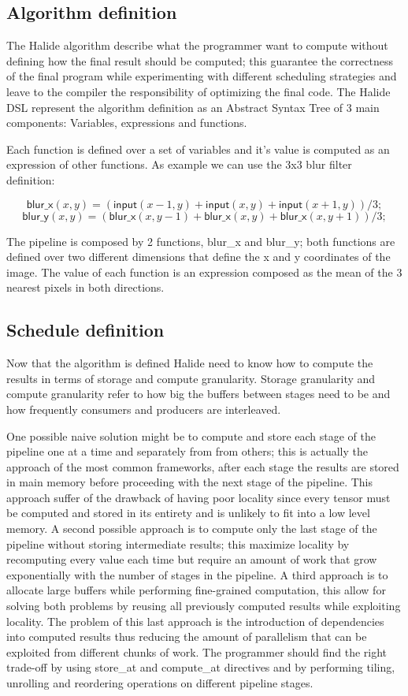 \documentclass[../main.tex]{subfiles}
\begin{document}
\subsection{Algorithm definition}
The Halide algorithm describe what the programmer want to compute without defining how the final result should be computed; this guarantee the correctness of the final program while experimenting with different scheduling strategies and leave to the compiler the responsibility of optimizing the final code.
The Halide DSL represent the algorithm definition as an Abstract Syntax Tree of 3 main components: Variables, expressions and functions.

\newpage
Each function is defined over a set of variables and it's value is computed as an expression of other functions. As example we can use the 3x3 blur filter definition:

\[ \mathsf{blur\_x}(x, y) = (\mathsf{input}(x-1, y) + \mathsf{input}(x, y) + \mathsf{input}(x+1, y))/3;\]
\[ \mathsf{blur\_y}(x, y) = (\mathsf{blur\_x}(x, y-1) + \mathsf{blur\_x}(x, y) + \mathsf{blur\_x}(x, y+1))/3;\]

The pipeline is composed by 2 functions, blur\_x and blur\_y; both functions are defined over two different dimensions that define the x and y coordinates of the image. The value of each function is an expression composed as the mean of the 3 nearest pixels in both directions.


\subsection{Schedule definition}
Now that the algorithm is defined Halide need to know how to compute the results in terms of storage and compute granularity. Storage granularity and compute granularity refer to how big the buffers between stages need to be and how frequently consumers and producers are interleaved.

One possible naive solution might be to compute and store each stage of the pipeline one at a time and separately from from others; this is actually the approach of the most common frameworks, after each stage the results are stored in main memory before proceeding with the next stage of the pipeline. This approach suffer of the drawback of having poor locality since every tensor must be computed and stored in its entirety and is unlikely to fit into a low level memory. 
A second possible approach is to compute only the last stage of the pipeline without storing intermediate results; this maximize locality by recomputing every value each time but require an amount of work that grow exponentially with the number of stages in the pipeline.
A third approach is to allocate large buffers while performing fine-grained computation, this allow for solving both problems by reusing all previously computed results while exploiting locality. The problem of this last approach is the introduction of dependencies into computed results thus reducing the amount of parallelism that can be exploited from different chunks of work.
The programmer should find the right trade-off by using store\_at and compute\_at directives and by performing tiling, unrolling and reordering operations on different pipeline stages.
\end{document}
